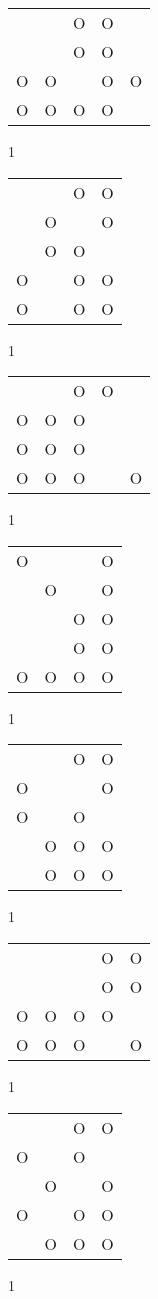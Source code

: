 \begin{tabular}{|m{0.2cm}m{0.2cm}m{0.2cm}m{0.2cm}m{0.2cm}|}\hline
 & &O&O& \\
 & &O&O& \\
O&O& &O&O\\
O&O&O&O& \\
\hline\end{tabular}1
\begin{tabular}{|m{0.2cm}m{0.2cm}m{0.2cm}m{0.2cm}|}\hline
 & &O&O\\
 &O& &O\\
 &O&O& \\
O& &O&O\\
O& &O&O\\
\hline\end{tabular}1
\begin{tabular}{|m{0.2cm}m{0.2cm}m{0.2cm}m{0.2cm}m{0.2cm}|}\hline
 & &O&O& \\
O&O&O& & \\
O&O&O& & \\
O&O&O& &O\\
\hline\end{tabular}1
\begin{tabular}{|m{0.2cm}m{0.2cm}m{0.2cm}m{0.2cm}|}\hline
O& & &O\\
 &O& &O\\
 & &O&O\\
 & &O&O\\
O&O&O&O\\
\hline\end{tabular}1
\begin{tabular}{|m{0.2cm}m{0.2cm}m{0.2cm}m{0.2cm}|}\hline
 & &O&O\\
O& & &O\\
O& &O& \\
 &O&O&O\\
 &O&O&O\\
\hline\end{tabular}1
\begin{tabular}{|m{0.2cm}m{0.2cm}m{0.2cm}m{0.2cm}m{0.2cm}|}\hline
 & & &O&O\\
 & & &O&O\\
O&O&O&O& \\
O&O&O& &O\\
\hline\end{tabular}1
\begin{tabular}{|m{0.2cm}m{0.2cm}m{0.2cm}m{0.2cm}|}\hline
 & &O&O\\
O& &O& \\
 &O& &O\\
O& &O&O\\
 &O&O&O\\
\hline\end{tabular}1
